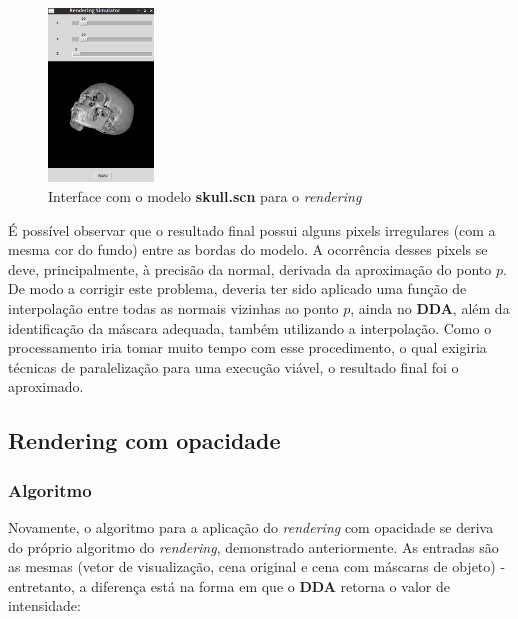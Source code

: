             \begin{figure}[ht!]
                \centering
                \includegraphics[width=1.1in]{figures/r_interface}
                \caption{Interface com o modelo \textbf{skull.scn} para o \textit{rendering}}
            \end{figure}

            É possível observar que o resultado final possui alguns pixels irregulares (com a mesma cor do fundo) entre as bordas do modelo. A ocorrência desses pixels se deve, principalmente, à precisão da normal, derivada da aproximação do ponto $p$. De modo a corrigir este problema, deveria ter sido aplicado uma função de interpolação entre todas as normais vizinhas ao ponto $p$, ainda no \textbf{DDA}, além da identificação da máscara adequada, também utilizando a interpolação. Como o processamento iria tomar muito tempo com esse procedimento, o qual exigiria técnicas de paralelização para uma execução viável, o resultado final foi o aproximado.

    \subsection{Rendering com opacidade}
        \subsubsection{Algoritmo}
            Novamente, o algoritmo para a aplicação do \textit{rendering} com opacidade se deriva do próprio algoritmo do \textit{rendering}, demonstrado anteriormente. As entradas são as mesmas (vetor de visualização, cena original e cena com máscaras de objeto) - entretanto, a diferença está na forma em que o \textbf{DDA} retorna o valor de intensidade:

